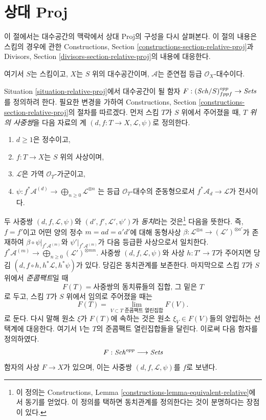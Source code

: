 \section{상대 Proj}
\label{section-relative-proj}

\noindent
이 절에서는 대수공간의 맥락에서 상대 Proj의 구성을 다시 살펴본다.
이 절의 내용은 스킴의 경우에 관한 Constructions, Section
\ref{constructions-section-relative-proj}과 Divisors, Section
\ref{divisors-section-relative-proj}의 내용에 대응한다.

\begin{situation}
\label{situation-relative-proj}
여기서 $S$는 스킴이고, $X$는 $S$ 위의 대수공간이며,
$\mathcal{A}$는 준연접 등급 $\mathcal{O}_X$-대수이다.
\end{situation}

\noindent
Situation \ref{situation-relative-proj}에서 대수공간이 될 함자
$F : (\mathit{Sch}/S)_{fppf}^{opp} \to \textit{Sets}$를 정의하려 한다.
필요한 변경을 가하여 Constructions, Section
\ref{constructions-section-relative-proj}의 절차를 따르겠다.
먼저 스킴 $T$가 $S$ 위에서 주어졌을 때, {\it $T$ 위의 사중쌍}을 다음
자료의 계
$(d, f : T \to X, \mathcal{L}, \psi)$로 정의한다.
\begin{enumerate}
\item $d \geq 1$은 정수이고,
\item $f : T \to X$는 $S$ 위의 사상이며,
\item $\mathcal{L}$은 가역 $\mathcal{O}_T$-가군이고,
\item
$\psi : f^*\mathcal{A}^{(d)} \to \bigoplus_{n \geq 0}\mathcal{L}^{\otimes n}$
는 등급 $\mathcal{O}_T$-대수의 준동형으로서
$f^*\mathcal{A}_d \to \mathcal{L}$가 전사이다.
\end{enumerate}
두 사중쌍 $(d, f, \mathcal{L}, \psi)$와
$(d', f', \mathcal{L}', \psi')$가 {\it 동치}라는 것은\footnote{이 정의는
Constructions, Lemma \ref{constructions-lemma-equivalent-relative}에서
동기를 얻었다. 이 정의를 택하면 동치관계를 정의한다는 것이 분명하다는
장점이 있다.} 다음을 뜻한다. 즉, $f = f'$이고 어떤 양의 정수
$m = ad = a'd'$에 대해 동형사상
$\beta : \mathcal{L}^{\otimes a} \to (\mathcal{L}')^{\otimes a'}$가
존재하여 $\beta \circ \psi|_{f^*\mathcal{A}^{(m)}}$와
$\psi'|_{f^*\mathcal{A}^{(m)}}$가 다음 등급환 사상으로서 일치한다.
$f^*\mathcal{A}^{(m)} \to \bigoplus_{n \geq 0} (\mathcal{L}')^{\otimes mn}$.
사중쌍 $(d, f, \mathcal{L}, \psi)$와 사상 $h : T' \to T$가 주어지면
당김 $(d, f \circ h, h^*\mathcal{L}, h^*\psi)$가 있다. 당김은
동치관계를 보존한다. 마지막으로 스킴 $T$가 $S$ 위에서
{\it 준콤팩트}일 때
$$
F(T) = \text{사중쌍의 동치류들의 집합, 그 밑은 }T
$$
로 두고, 스킴 $T$가 $S$ 위에서 임의로 주어졌을 때는
$$
F(T)
=
\lim_{V \subset T\text{ 준콤팩트 열린집합}} F(V).
$$
로 둔다. 다시 말해 원소 $\xi$가 $F(T)$에 속하는 것은 원소
$\xi_V \in F(V)$들의 양립하는 선택계에 대응한다. 여기서 $V$는
$T$의 준콤팩트 열린집합들을 달린다. 이로써 다음 함자를 정의하였다.
\begin{equation}
\label{equation-proj}
F : \mathit{Sch}^{opp} \longrightarrow \textit{Sets}
\end{equation}
함자의 사상 $F \to X$가 있으며, 이는 사중쌍
$(d, f, \mathcal{L}, \psi)$를 $f$로 보낸다.

